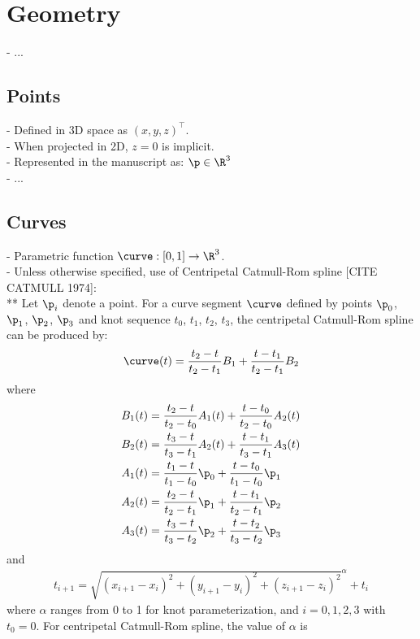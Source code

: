\chapter{Geometry}
- ...

\section{Points}
- Defined in 3D space as $\left( x, y, z \right)^\intercal$. \\
- When projected in 2D, $z = 0$ is implicit. \\
- Represented in the manuscript as: $\p \in \R^3$ \\
- ...

\section{Curves}
- Parametric function $\curve: [0, 1] \to \R^3$. \\
- Unless otherwise specified, use of Centripetal Catmull-Rom spline [CITE CATMULL 1974]: \\
** Let $\p_i$ denote a point. For a curve segment $\curve$ defined by points $\p_0$, $\p_1$, $\p_2$, $\p_3$ and knot sequence $t_0$, $t_1$, $t_2$, $t_3$, the centripetal Catmull-Rom spline can be produced by:
\begin{align}
    \curve(t) = \frac{t_2 - t}{t_2 - t_1} B_1 + \frac{t - t_1}{t_2 - t_1} B_2
\end{align}
where
\begin{align}
    B_1(t) &= \frac {t_2 - t}{t_2 - t_0} A_1(t) + \frac{t - t_0}{t_2 - t_0} A_2(t) \\
    B_2(t) &= \frac{t_3 - t}{t_3 - t_1} A_2(t) + \frac{t - t_1}{t_3 - t_1} A_3(t) \\
    A_1(t) &= \frac{t_1 - t}{t_1 - t_0} \p_0 + \frac{t - t_0}{t_1 - t_0} \p_1 \\
    A_2(t) &= \frac{t_2 - t}{t_2 - t_1} \p_1 + \frac{t - t_1}{t_2 - t_1} \p_2 \\
    A_3(t) &= \frac{t_3 - t}{t_3 - t_2} \p_2 + \frac{t - t_2}{t_3 - t_2} \p_3
\end{align}
and
\begin{align}
    t_{i + 1} = \sqrt{ \left(x_{i+1} - x_i \right)^2 + \left(y_{i+1} - y_i \right)^2 +  \left(z_{i+1} - z_i \right)^2 }^\alpha + t_i
\end{align}
where $\alpha$ ranges from 0 to 1 for knot parameterization, and $i = 0, 1, 2, 3$ with $t_0 = 0$. For centripetal Catmull-Rom spline, the value of $\alpha$ is 
